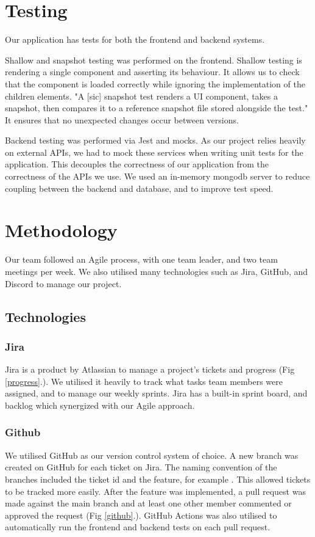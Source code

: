 \documentclass[conference]{IEEEtran}
\begin{document}
\section{Testing}
Our application has tests for both the frontend and backend systems.

Shallow and snapshot testing was performed on the frontend. Shallow testing is rendering a single component and asserting its behaviour. It allows us to check that the component is loaded correctly while ignoring the implementation of the children elements. "A [sic] snapshot test renders a UI component, takes a snapshot, then compares it to a reference snapshot file stored alongside the test.\cite{b1}" It ensures that no unexpected changes occur between versions.

Backend testing was performed via Jest and mocks. As our project relies heavily on external APIs, we had to mock these services when writing unit tests for the application. This decouples the correctness of our application from the correctness of the APIs we use. We used an in-memory mongodb server to reduce coupling between the backend and database, and to improve test speed.

\section{Methodology}
Our team followed an Agile process, with one team leader, and two team meetings per week. We also utilised many technologies such as Jira, GitHub, and Discord to manage our project.

\subsection{Technologies}
\subsubsection{Jira}
Jira is a product by Atlassian to manage a project's tickets and progress (Fig \ref{progress}.). We utilised it heavily to track what tasks team members were assigned, and to manage our weekly sprints. Jira has a built-in sprint board, and backlog which synergized with our Agile approach.

\subsubsection{Github}
We utilised GitHub as our version control system of choice. A new branch was created on GitHub for each ticket on Jira. The naming convention of the branches included the ticket id and the feature, for example . This allowed tickets to be tracked more easily. After the feature was implemented, a pull request was made against the main branch and at least one other member commented or approved the request (Fig \ref{github}.). GitHub Actions was also utilised to automatically run the frontend and backend tests on each pull request. 
\end{document}
